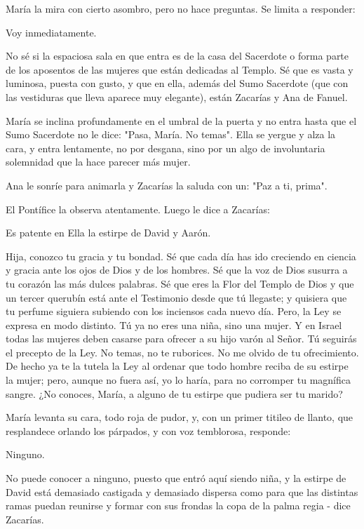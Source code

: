 \documentclass[12pt, twoside, openright]{book} %
\begin{document}
María la mira con cierto asombro, pero no hace preguntas. Se limita a responder: 

Voy inmediatamente. 

No sé si la espaciosa sala en que entra es de la casa del Sacerdote o forma parte de los aposentos de las mujeres que están dedicadas al Templo. Sé que es vasta y luminosa, puesta con gusto, y que en ella, además del Sumo Sacerdote (que con las vestiduras que lleva aparece muy elegante), están Zacarías y Ana de Fanuel. 

María se inclina profundamente en el umbral de la puerta y no entra hasta que el Sumo Sacerdote no le dice: "Pasa, María. No temas". Ella se yergue y alza la cara, y entra lentamente, no por desgana, sino por un algo de involuntaria solemnidad que la hace parecer más mujer. 

Ana le sonríe para animarla y Zacarías la saluda con un: "Paz a ti, prima". 

El Pontífice la observa atentamente. Luego le dice a Zacarías: 

Es patente en Ella la estirpe de David y Aarón. 

Hija, conozco tu gracia y tu bondad. Sé que cada día has ido creciendo en ciencia y gracia ante los ojos de Dios y de los hombres. Sé que la voz de Dios susurra a tu corazón las más dulces palabras. Sé que eres la Flor del Templo de Dios y que un tercer querubín está ante el Testimonio desde que tú llegaste; y quisiera que tu perfume siguiera subiendo con los inciensos cada nuevo día. Pero, la Ley se expresa en modo distinto. Tú ya no eres una niña, sino una mujer. Y en Israel todas las mujeres deben casarse para ofrecer a su hijo varón al Señor. Tú seguirás el precepto de la Ley. No temas, no te ruborices. No me olvido de tu ofrecimiento. De hecho ya te la tutela la Ley al ordenar que todo hombre reciba de su estirpe la mujer; pero, aunque no fuera así, yo lo haría, para no corromper tu magnífica sangre. ¿No conoces, María, a alguno de tu estirpe que pudiera ser tu marido? 

María levanta su cara, todo roja de pudor, y, con un primer titileo de llanto, que resplandece orlando los párpados, y con voz temblorosa, responde: 

Ninguno. 

No puede conocer a ninguno, puesto que entró aquí siendo niña, y la estirpe de David está demasiado castigada y demasiado dispersa como para que las distintas ramas puedan reunirse y formar con sus frondas la copa de la palma regia - dice Zacarías. 
\end{document}
